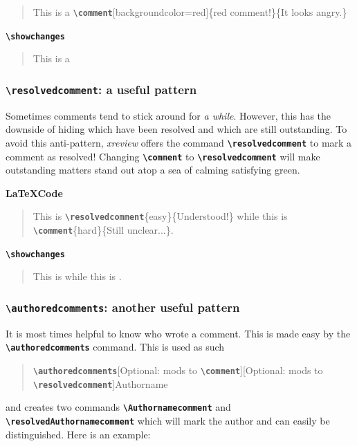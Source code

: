 \documentclass[a4paper]{ltxdoc}
\newcommand{\writecommand}[1]{\texttt{\textbf{{\textbackslash#1}}}}
\newcommand{\writearg}[1]{\{#1\}}
\begin{document}
\begin{quote}
    This is a \writecommand{comment}[backgroundcolor=red]\writearg{red comment!}\writearg{It looks angry.}
\end{quote}

\writecommand{showchanges}
\showchanges

\begin{quote}
This is a 
\end{quote}


\subsubsection{\writecommand{resolvedcomment}: a useful pattern}

Sometimes comments tend to stick around for \textit{a while}. However, this has the downside of hiding which have been resolved and which are still outstanding. 
To avoid this anti-pattern, \textit{xreview} offers the command \writecommand{resolvedcomment} to mark a comment as resolved!
Changing \writecommand{comment} to \writecommand{resolvedcomment} will make outstanding matters stand out atop a sea of calming satisfying green.

\textbf{\LaTeX Code}

\begin{quote}
    This is \writecommand{resolvedcomment}\writearg{easy}\writearg{Understood!} while this is \writecommand{comment}\writearg{hard}\writearg{Still unclear...}.
\end{quote}

\writecommand{showchanges}
\showchanges

\begin{quote}
This is  while this is .
\end{quote}

\subsubsection{\writecommand{authoredcomments}: another useful pattern}

It is most times helpful to know who wrote a comment. This is made easy by the \writecommand{authoredcomments} command. This is used as such 

\begin{quote}
    \writecommand{authoredcomments}[Optional: mods to \writecommand{comment}][Optional: mods to \writecommand{resolvedcomment}]{Authorname}
\end{quote}
\noindent
and creates two commands \writecommand{Authornamecomment} and \writecommand{resolvedAuthornamecomment} which will mark the author and can easily be distinguished.
Here is an example:
\end{document}
